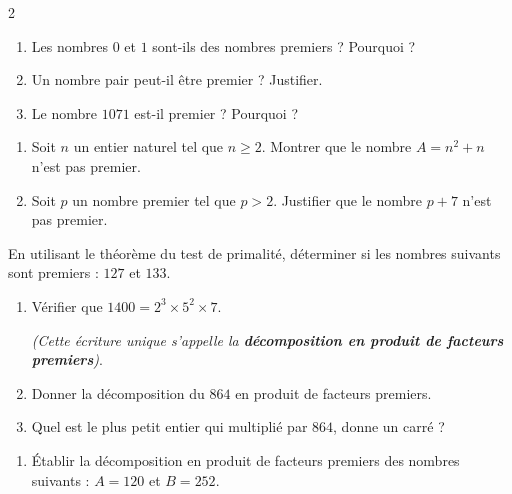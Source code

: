 \documentclass[10pt, a4paper]{article}
\begin{document}
\begin{multicols*}{2}
\begin{Activite}[][10 min]
\begin{enumerate}[leftmargin=*,itemsep=0.5pt]
    \item Les nombres $0$ et $1$ sont-ils des nombres premiers ? Pourquoi ?

    \item Un nombre pair peut-il être premier ? Justifier.

    \item Le nombre $1071$ est-il premier ? Pourquoi ?
\end{enumerate}
\end{Activite}

\begin{Application}[][15 min]
\begin{enumerate}[leftmargin=*,itemsep=0.5pt]
    \item Soit $n$ un entier naturel tel que $n \ge 2$.
          Montrer que le nombre $A = n^2 + n$ n'est pas premier.

    \item Soit $p$ un nombre premier tel que $p > 2$. Justifier que le nombre $p + 7$ n'est pas premier.
\end{enumerate}
\end{Application}

\begin{Application}[][15 min]
  En utilisant le théorème du test de primalité, déterminer si les nombres suivants sont premiers : $127$ et $133$.

\end{Application}

\begin{Activite}[][10 min]
\begin{enumerate}[leftmargin=*,itemsep=0.5pt]
   \item Vérifier que $1400 = 2^3 \times 5^2 \times 7 $.

   \textit{(Cette écriture unique s'appelle la \textbf{décomposition en produit de facteurs premiers})}.
    \item Donner la décomposition du $864$ en produit de facteurs premiers.
    \item Quel est le plus petit entier qui multiplié par $864$, donne un carré ?
\end{enumerate}
\end{Activite}

\begin{Application}[][20 min]
\begin{enumerate}[leftmargin=*,itemsep=0.5pt]
    \item Établir la décomposition en produit de facteurs premiers des nombres suivants : $A = 120$ et $B = 252$.


\end{enumerate}
\end{Application}
\end{multicols*}
\end{document}
